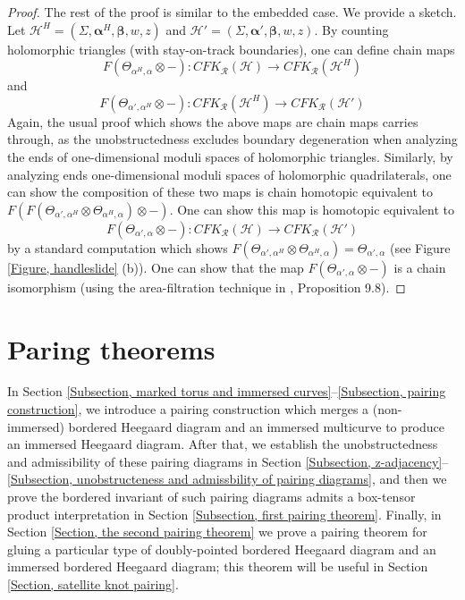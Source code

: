 \documentclass{amsart}
\theoremstyle{definition}
\theoremstyle{remark}
\numberwithin{equation}{section}
\numberwithin{equation}{section} \makeatletter
\begin{document}
\begin{proof}
The rest of the proof is similar to the embedded case. We provide a sketch. Let $\mathcal{H}^H=(\Sigma,\bm{\alpha}^H,\bm{\beta},w,z)$ and $\mathcal{H}'=(\Sigma,\bm{\alpha'},\bm{\beta},w,z)$. By counting holomorphic triangles (with stay-on-track boundaries), one can define chain maps
$$F(\Theta_{\alpha^H,\alpha}\otimes -): CFK_\mathcal{R}(\mathcal{H})\rightarrow CFK_\mathcal{R}(\mathcal{H}^H)$$
and  
$$F(\Theta_{\alpha',\alpha^H}\otimes -): CFK_\mathcal{R}(\mathcal{H}^H)\rightarrow CFK_\mathcal{R}(\mathcal{H}')$$
Again, the usual proof which shows the above maps are chain maps carries through, as the unobstructedness excludes boundary degeneration when analyzing the ends of one-dimensional moduli spaces of holomorphic triangles. Similarly, by analyzing ends one-dimensional moduli spaces of holomorphic quadrilaterals, one can show the composition of these two maps is chain homotopic equivalent to $F(F(\Theta_{\alpha',\alpha^H}\otimes\Theta_{\alpha^H,\alpha})\otimes -)$. One can show this map is homotopic equivalent to $$F(\Theta_{\alpha',\alpha}\otimes -): CFK_\mathcal{R}(\mathcal{H})\rightarrow CFK_\mathcal{R}(\mathcal{H}')$$ by a standard computation which shows $F(\Theta_{\alpha',\alpha^H}\otimes\Theta_{\alpha^H,\alpha})=\Theta_{\alpha',\alpha}$ (see Figure \ref{Figure, handleslide} (b)). One can show that the map $F(\Theta_{\alpha',\alpha}\otimes -)$ is a chain isomorphism (using the area-filtration technique in \cite{OS04}, Proposition 9.8). 
\end{proof} 

\section{Paring theorems}\label{Section, pairing theorem section}
In Section \ref{Subsection, marked torus and immersed curves}--\ref{Subsection, pairing construction}, we introduce a pairing construction which merges a (non-immersed) bordered Heegaard diagram and an immersed multicurve to produce an immersed Heegaard diagram. After that, we establish the unobstructedness and admissibility of these pairing diagrams in Section \ref{Subsection, z-adjacency}--\ref{Subsection, unobstructeness and admissbility of pairing diagrams}, and then we prove the bordered invariant of such pairing diagrams admits a box-tensor product interpretation in Section \ref{Subsection, first pairing theorem}. Finally, in Section \ref{Section, the second pairing theorem} we prove a pairing theorem for gluing a particular type of doubly-pointed bordered Heegaard diagram and an immersed bordered Heegaard diagram; this theorem will be useful in Section \ref{Section, satellite knot pairing}. 
\end{document}
